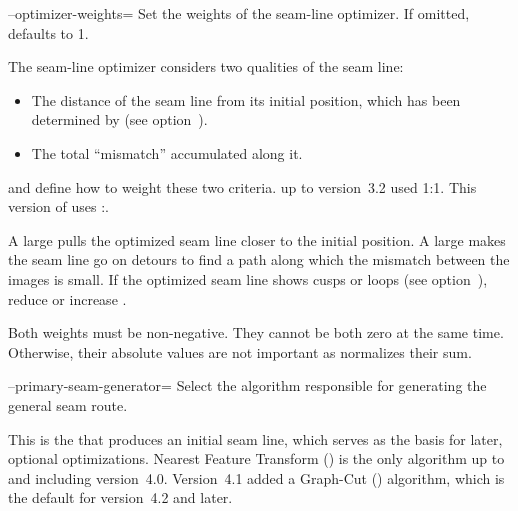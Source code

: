 \begin{codelist}
  \label{opt:optimizer-weights}%
\item[--optimizer-weights=\metavar{DISTANCE-WEIGHT}\optional{:\metavar{MISMATCH-WEIGHT}}]\itemend
  Set the weights of the seam-line optimizer.  If omitted,  defaults to
  1.

  The seam-line optimizer considers two qualities of the seam line:

  \begin{itemize}
  \item
    The distance of the seam line from its initial position, which has been determined by
     (see option~).

  \item
    The total ``mismatch'' accumulated along it.
  \end{itemize}

   and  define how to weight these two
  criteria.  \App{} up to version~3.2 used 1:1.  This version of \App{} uses
  :.

  A large  pulls the optimized seam line closer to the initial
  position.  A large  makes the seam line go on detours to find a
  path along which the mismatch between the images is small.  If the optimized seam line shows
  cusps or loops (see option~), reduce
   or increase .

  Both weights must be non-negative.  They cannot be both zero at the same time.  Otherwise,
  their absolute values are not important as \App{} normalizes their sum.


  \label{opt:primary-seam-generator}%
\item[--primary-seam-generator=\metavar{ALGORITHM}]\itemend
  Select the algorithm responsible for generating the general seam route.

  This is the  that produces an initial seam line, which serves as the basis
  for later, optional optimizations.  Nearest Feature Transform () is the only
  algorithm up to and including \App{} version~4.0.  Version~4.1 added a Graph-Cut
  () algorithm, which is the default for version~4.2 and later.


\end{codelist}
